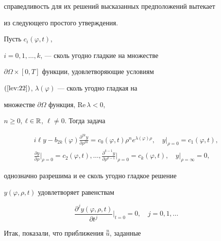 справедливость для их решений высказанных предположений вытекает


из следующего простого утверждения.





\begin{lemnonum}


Пусть $c_i(\varphi,t)$,


$i=0,1,\dotsc,k$, --- сколь угодно гладкие на множестве


$\partial\Omega\times[0,T]$ функции, удовлетворяющие условиям


$(\ref{lev:22})$, $\lambda(\varphi)$ ---  сколь угодно гладкая на


множестве $\partial\Omega$ функция, $\mathrm{Re\,}\lambda<0$,


$n\geqslant 0$, $\ell\in\Bbb R$, $\ell\ne0$. Тогда задача


\begin{gather*}


i\ell y-b_{2k}(\varphi) \frac{\partial^{2k}y}{\partial


\rho^{2k}}=


c_0(\varphi,t)\rho^n e^{\lambda(\varphi)\rho},\quad


y\big|_{\rho=0}=c_1(\varphi,t),\\


%


\frac{\partial y}{\partial \rho}\Big|_{\rho=0}=c_2(\varphi,t),


\dotsc,


\frac{\partial^{k-1}y}{\partial \rho^{k-1}}\Big|_{\rho=0}=c_k(\varphi,t),\quad


y\big|_{\rho=\infty}=0,


\end{gather*}


однозначно разрешима и ее сколь угодно гладкое решение


$y(\varphi,\rho,t)$ удовлетворяет равенствам


$$


\frac{\partial^j y(\varphi,\rho,t)}


{\partial t^j}\Big|_{t=0}=0,\quad j=0,1,\dotsc


$$


\end{lemnonum}





Итак, показали, что приближения $\overset{n}{u}{}$, заданные


